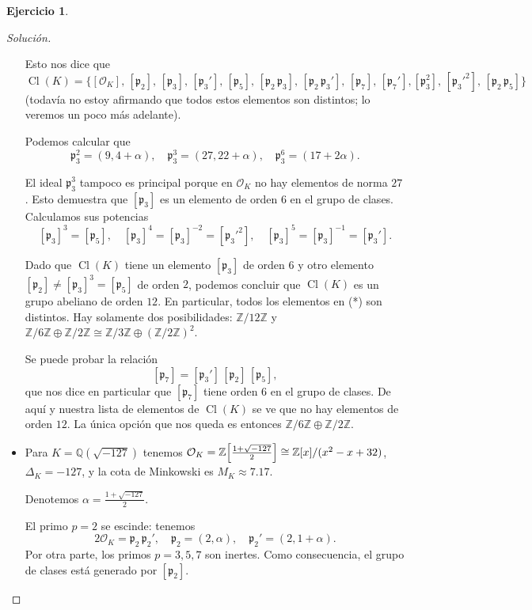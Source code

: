 \documentclass{article}
\newcounter{tarea}
\theoremstyle{definition}
\newtheorem{ejercicio}{Ejercicio}[tarea]
\newenvironment{solucion}{\begin{proof}[Solución]}{\end{proof}}
\DeclareMathOperator{\Cl}{Cl}
\newcommand{\ZZ}{\mathbb{Z}}
\newcommand{\QQ}{\mathbb{Q}}
\renewcommand{\O}{\mathcal{O}}
\begin{document}
\begin{ejercicio}
\begin{solucion}
\begin{itemize}
      Esto nos dice que
      \[ \tag{*}
        \Cl (K) = \{
        [\O_K], \,
        [\mathfrak{p}_2], \,
        [\mathfrak{p}_3], \,
        [\mathfrak{p}_3'], \,
        [\mathfrak{p}_5], \,
        [\mathfrak{p}_2\,\mathfrak{p}_3], \,
        [\mathfrak{p}_2\,\mathfrak{p}_3'], \,
        [\mathfrak{p}_7], \,
        [\mathfrak{p}_7'],
        [\mathfrak{p}_3^2], \,
        [\mathfrak{p}_3'^2], \,
        [\mathfrak{p}_2\,\mathfrak{p}_5] \} \]
      (todavía no estoy afirmando que todos estos elementos son distintos;
      lo veremos un poco más adelante).

      Podemos calcular que
      \[ \mathfrak{p}_3^2 = (9, 4 + \alpha), \quad
        \mathfrak{p}_3^3 = (27, 22 + \alpha), \quad
        \mathfrak{p}_3^6 = (17 + 2\alpha). \]

      El ideal $\mathfrak{p}_3^3$ tampoco es principal porque en $\O_K$ no hay
      elementos de norma $27$. Esto demuestra que $[\mathfrak{p}_3]$ es un
      elemento de orden $6$ en el grupo de clases. Calculamos sus potencias
      \[ [\mathfrak{p}_3]^3 = [\mathfrak{p}_5], \quad
        [\mathfrak{p}_3]^4 = [\mathfrak{p}_3]^{-2} = [\mathfrak{p}_3'^2], \quad
        [\mathfrak{p}_3]^5 = [\mathfrak{p}_3]^{-1} = [\mathfrak{p}_3']. \]

      Dado que $\Cl (K)$ tiene un elemento $[\mathfrak{p}_3]$ de orden $6$ y
      otro elemento $[\mathfrak{p}_2] \ne [\mathfrak{p}_3]^3 = [\mathfrak{p}_5]$
      de orden $2$, podemos concluir que $\Cl (K)$ es un grupo abeliano de orden
      $12$. En particular, todos los elementos en (*) son distintos.
      Hay solamente dos posibilidades: $\ZZ/12\ZZ$ y
      $\ZZ/6\ZZ \oplus \ZZ/2\ZZ \cong \ZZ/3\ZZ \oplus (\ZZ/2\ZZ)^2$.

      Se puede probar la relación
      \[ [\mathfrak{p}_7] = [\mathfrak{p}_3']\,[\mathfrak{p}_2]\,[\mathfrak{p}_5], \]
      que nos dice en particular que $[\mathfrak{p}_7]$ tiene orden $6$ en el
      grupo de clases. De aquí y nuestra lista de elementos de $\Cl (K)$ se ve
      que no hay elementos de orden $12$. La única opción que nos queda es
      entonces $\ZZ/6\ZZ \oplus \ZZ/2\ZZ$.

    \item Para $K = \QQ (\sqrt{-127})$ tenemos
      $\O_K = \ZZ \Bigl[\frac{1+\sqrt{-127}}{2}\Bigr] \cong \ZZ[x]/(x^2 - x + 32)$,
      $\Delta_K = -127$, y la cota de Minkowski es $M_K \approx 7.17$.

      Denotemos $\alpha = \frac{1+\sqrt{-127}}{2}$.

      El primo $p = 2$ se escinde: tenemos
      \[ 2\O_K = \mathfrak{p}_2\,\mathfrak{p}_2', \quad
        \mathfrak{p}_2 = (2, \alpha), \quad
        \mathfrak{p}_2' = (2, 1+\alpha). \]
      Por otra parte, los primos $p = 3, 5, 7$ son inertes.
      Como consecuencia, el grupo de clases está generado por
      $[\mathfrak{p}_2]$.


\end{itemize}
\end{solucion}
\end{ejercicio}
\end{document}
